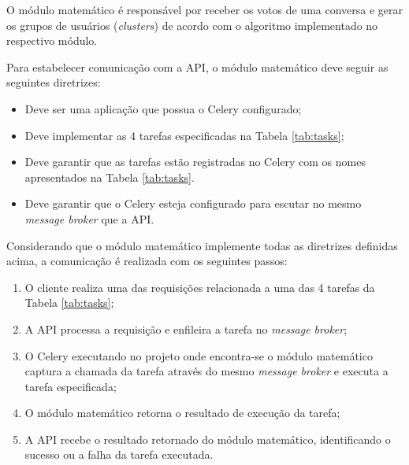 	O módulo matemático é responsável por receber os votos de uma conversa
	e gerar os grupos de usuários (\textit{clusters}) de acordo com o algoritmo implementado no respectivo módulo.

	Para estabelecer comunicação com a API, o módulo matemático deve seguir as seguintes diretrizes:
	\begin{itemize}
	  \item Deve ser uma aplicação que possua o Celery configurado;
	  \item Deve implementar as 4 tarefas especificadas na Tabela \ref{tab:tasks};
	  \item Deve garantir que as tarefas estão registradas no Celery com os nomes apresentados na Tabela \ref{tab:tasks}.
	  \item Deve garantir que o Celery esteja configurado para escutar no mesmo \textit{message broker} que a API.
	\end{itemize}
	
	
	Considerando que o módulo matemático implemente todas as diretrizes definidas acima, a comunicação é realizada com 
	os seguintes passos:
	  
	\begin{enumerate}
	\item O cliente realiza uma das requisições relacionada a uma das 4 tarefas da Tabela \ref{tab:tasks};
	\item A API processa a requisição e enfileira a tarefa no \textit{message broker};
	\item O Celery executando no projeto onde encontra-se o módulo matemático captura a chamada da tarefa através do mesmo \textit{message broker} e 
	executa a tarefa especificada;
	\item O módulo matemático retorna o resultado de execução da tarefa;
	\item A API recebe o resultado retornado do módulo matemático, identificando o sucesso ou a falha da tarefa executada.
	\end{enumerate}

